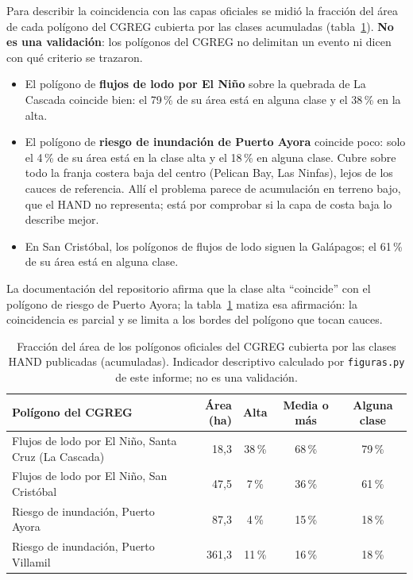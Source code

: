 \documentclass{sosg-informe}
\begin{document}
Para describir la coincidencia con las capas oficiales se midió la fracción del área de cada polígono del CGREG cubierta por las clases acumuladas (tabla~\ref{tab:solape}). \textbf{No es una validación}: los polígonos del CGREG no delimitan un evento ni dicen con qué criterio se trazaron.
\begin{itemize}
  \item El polígono de \textbf{flujos de lodo por El Niño} sobre la quebrada de La Cascada coincide bien: el 79\,\% de su área está en alguna clase y el 38\,\% en la alta.
  \item El polígono de \textbf{riesgo de inundación de Puerto Ayora} coincide poco: solo el 4\,\% de su área está en la clase alta y el 18\,\% en alguna clase. Cubre sobre todo la franja costera baja del centro (Pelican Bay, Las Ninfas), lejos de los cauces de referencia. Allí el problema parece de acumulación en terreno bajo, que el HAND no representa; está por comprobar si la capa de costa baja lo describe mejor.
  \item En San Cristóbal, los polígonos de flujos de lodo siguen la Galápagos; el 61\,\% de su área está en alguna clase.
\end{itemize}
La documentación del repositorio afirma que la clase alta \enquote{coincide} con el polígono de riesgo de Puerto Ayora; la tabla~\ref{tab:solape} matiza esa afirmación: la coincidencia es parcial y se limita a los bordes del polígono que tocan cauces.

\begin{table}[ht]
  \centering\small
  \caption{Fracción del área de los polígonos oficiales del CGREG cubierta por las clases HAND publicadas (acumuladas). Indicador descriptivo calculado por \texttt{figuras.py} de este informe; no es una validación.}
  \label{tab:solape}
  \begin{tabular}{lrccc}
    \toprule
    Polígono del CGREG & Área (ha) & Alta & Media o más & Alguna clase \\
    \midrule
    Flujos de lodo por El Niño, Santa Cruz (La Cascada) & 18,3 & 38\,\% & 68\,\% & 79\,\% \\
    Flujos de lodo por El Niño, San Cristóbal & 47,5 & 7\,\% & 36\,\% & 61\,\% \\
    Riesgo de inundación, Puerto Ayora & 87,3 & 4\,\% & 15\,\% & 18\,\% \\
    Riesgo de inundación, Puerto Villamil & 361,3 & 11\,\% & 16\,\% & 18\,\% \\
    \bottomrule
  \end{tabular}
\end{table}
\end{document}
